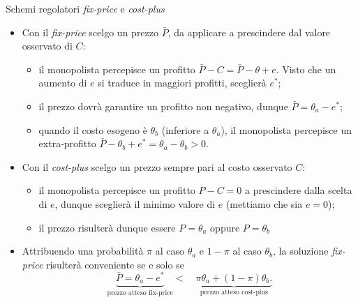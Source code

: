 \documentclass[aspectratio=64,12pt]{beamer}
\begin{document}
\begin{frame}{Schemi regolatori \emph{fix-price} e \emph{cost-plus}}
\begin{itemize}
\item Con il \emph{fix-price} scelgo un prezzo $\bar P$, da applicare a
prescindere dal valore osservato di $C$:
\begin{itemize}
\item il monopolista percepisce un profitto $\bar P - C = \bar P - \theta +
    e$. Visto che un aumento di $e$ si traduce in maggiori profitti, sceglierà
$e^*$;
\item il prezzo dovrà garantire un profitto non negativo, dunque $\bar P=\theta_a-e^*$;
\item quando il costo esogeno è $\theta_b$ (inferiore a $\theta_a$), il
monopolista percepisce un extra-profitto $\bar P-\theta_b+e^*=\theta_a-\theta_b>0$.
\end{itemize}
\item Con il \emph{cost-plus} scelgo un prezzo sempre pari al costo osservato $C$:    
\begin{itemize}
\item il monopolista percepisce un profitto $P-C=0$ a prescindere dalla scelta
di $e$, dunque sceglierà il minimo valore di $e$ (mettiamo che sia $e=0$);
\item il prezzo risulterà dunque essere $P=\theta_a$ oppure $P=\theta_b$
\end{itemize}
\item Attribuendo una probabilità $\pi$ al caso $\theta_a$ e $1-\pi$ al caso
$\theta_b$, la soluzione \emph{fix-price} risulterà conveniente se e solo se
\begin{equation*}
   \underbrace{\bar P=\theta_a-e^*}_{\text{prezzo atteso fix-price}}
   <\quad\underbrace{\pi\theta_a+(1-\pi)\theta_b.}_{\text{prezzo atteso cost-plus}}
\end{equation*}
\end{itemize}
\end{frame}
\end{document}
